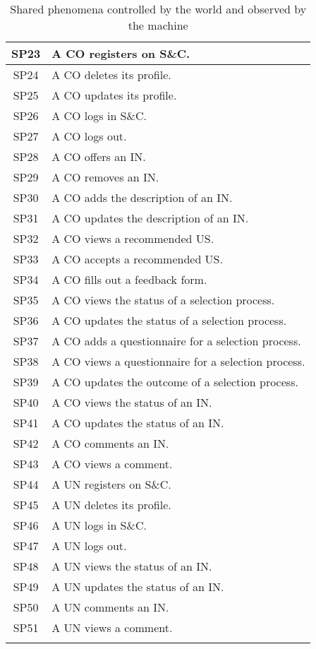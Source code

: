 \begin{longtable}{|c|p{10.5cm}|}
    SP23 & A CO registers on S\&C. \\ \hline
    SP24 & A CO deletes its profile. \\ \hline
    SP25 & A CO updates its profile. \\ \hline
    SP26 & A CO logs in S\&C. \\ \hline
    SP27 & A CO logs out. \\ \hline
    SP28 & A CO offers an IN. \\ \hline
    SP29 & A CO removes an IN. \\ \hline
    SP30 & A CO adds the description of an IN. \\ \hline
    SP31 & A CO updates the description of an IN. \\ \hline
    SP32 & A CO views a recommended US. \\ \hline
    SP33 & A CO accepts a recommended US. \\ \hline
    SP34 & A CO fills out a feedback form. \\ \hline
    SP35 & A CO views the status of a selection process. \\ \hline
    SP36 & A CO updates the status of a selection process. \\ \hline
    SP37 & A CO adds a questionnaire for a selection process. \\ \hline
    SP38 & A CO views a questionnaire for a selection process. \\ \hline
    SP39 & A CO updates the outcome of a selection process. \\ \hline
    SP40 & A CO views the status of an IN. \\ \hline
    SP41 & A CO updates the status of an IN. \\ \hline
    SP42 & A CO comments an IN. \\ \hline
    SP43 & A CO views a comment. \\ \hline
    
    SP44 & A UN registers on S\&C. \\ \hline
    SP45 & A UN deletes its profile. \\ \hline
    SP46 & A UN logs in S\&C. \\ \hline
    SP47 & A UN logs out. \\ \hline
    SP48 & A UN views the status of an IN. \\ \hline
    SP49 & A UN updates the status of an IN. \\ \hline
    SP50 & A UN comments an IN. \\ \hline
    SP51 & A UN views a comment. \\ \hline
\caption{Shared phenomena controlled by the world and observed by the machine}
\end{longtable}

